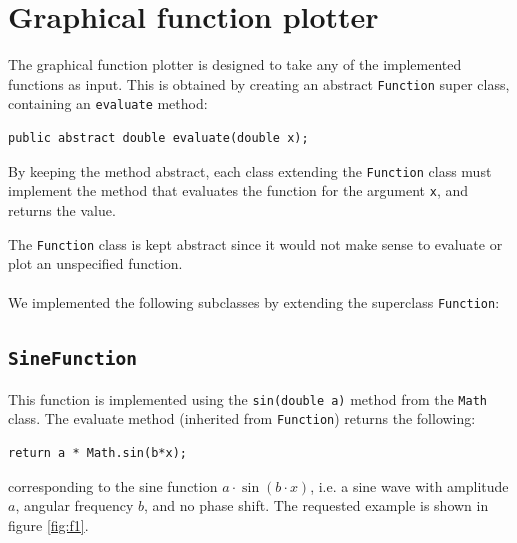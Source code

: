 \section{Graphical function plotter}

The graphical function plotter is designed to take any of the implemented functions as input. This is obtained by creating an abstract \texttt{Function} super class, containing an \texttt{evaluate} method:

\begin{lstlisting}
public abstract double evaluate(double x);
\end{lstlisting}

By keeping the method abstract, each class extending the \texttt{Function} class must implement the method that evaluates the function for the argument \texttt{x}, and returns the value. 

The \texttt{Function} class is kept abstract since it would not make sense to evaluate or plot an unspecified function.\\
\\
We implemented the following subclasses by extending the superclass \texttt{Function}:

\subsection{\texttt{SineFunction}}
This function is implemented using the \texttt{sin(double a)} method from the \texttt{Math} class. The evaluate method (inherited from \texttt{Function}) returns the following:

\begin{lstlisting}
return a * Math.sin(b*x);
\end{lstlisting}

corresponding to the sine function $a \cdot \sin(b \cdot x)$, i.e. a sine wave with amplitude $a$, angular frequency $b$, and no phase shift. The requested example is shown in figure \ref{fig:f1}.

